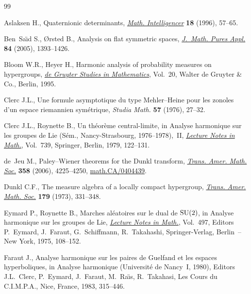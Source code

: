 \documentclass[pdftex]{sigma}
\numberwithin{equation}{section}
\begin{document}
\begin{thebibliography}{99}
\footnotesize \itemsep=0pt

Aslaksen H., Quaternionic determinants, \href{http://dx.doi.org/10.1007/BF03024312}{\textit{Math. Intelligencer}}
  \textbf{18} (1996), 57--65.

Ben~Sa{\"{\i}}d S., {\O}rsted B., Analysis on f\/lat symmetric spaces,
  \href{http://dx.doi.org/10.1016/j.matpur.2005.01.006}{\textit{J.~Math. Pures Appl.}} \textbf{84} (2005), 1393--1426.

Bloom W.R., Heyer H., Harmonic analysis of probability measures on hypergroups,
  \href{http://dx.doi.org/10.1515/9783110877595}{\textit{de Gruyter Studies in Mathematics}}, Vol.~20, Walter de Gruyter \&
  Co., Berlin, 1995.

Clerc J.L., Une formule asymptotique du type {M}ehler--{H}eine pour les zonoles
  d'un espace riemannien sym\'etrique, \textit{Studia Math.} \textbf{57}
  (1976), 27--32.

Clerc J.L., Roynette B., Un th\'eor\`eme central-limite, in Analyse harmonique
  sur les groupes de {L}ie ({S}\'em., {N}ancy-{S}trasbourg, 1976--1978),~{II},
  \href{http://dx.doi.org/10.1007/BFb0062490}{\textit{Lecture Notes in Math.}}, Vol.~739, Springer, Berlin, 1979, 122--131.

de~Jeu M., Paley--{W}iener theorems for the {D}unkl transform, \href{http://dx.doi.org/10.1090/S0002-9947-06-03960-2}{\textit{Trans.
  Amer. Math. Soc.}} \textbf{358} (2006), 4225--4250, \href{http://arxiv.org/abs/math.CA/0404439}{math.CA/0404439}.

Dunkl C.F., The measure algebra of a locally compact hypergroup, \href{http://dx.doi.org/10.1090/S0002-9947-1973-0320635-2}{\textit{Trans.
  Amer. Math. Soc.}} \textbf{179} (1973), 331--348.

Eymard P., Roynette B., Marches al\'{e}atoires sur le dual de ${\rm SU}(2)$, in
  Analyse harmonique sur les groupes de {L}ie, \href{http://dx.doi.org/10.1007/BFb0078014}{\textit{Lecture Notes in
  Math.}}, Vol.~497, Editors P.~Eymard, J.~Faraut, G.~Schif\/fmann,
  R.~Takahashi, Springer-Verlag, Berlin~-- New York, 1975, 108--152.

Faraut J., Analyse harmonique sur les paires de Guelfand et les espaces
  hyperboliques, in Analyse harmonique (Universit\'e de Nancy~I, 1980), Editors
  J.L.~Clerc, P.~Eymard, J.~Faraut, M.~Ra\"{\i}s, R.~Takahasi, Les Cours du
  C.I.M.P.A., Nice, France, 1983, 315--446.


\end{thebibliography}
\end{document}
